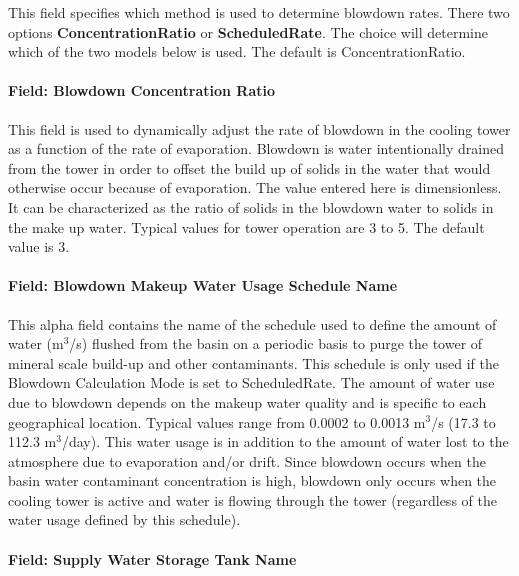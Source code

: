 This field specifies which method is used to determine blowdown rates. There two options \textbf{ConcentrationRatio} or \textbf{ScheduledRate}. The choice will determine which of the two models below is used. The default is ConcentrationRatio.

\paragraph{Field: Blowdown Concentration Ratio}\label{field-blowdown-concentration-ratio}

This field is used to dynamically adjust the rate of blowdown in the cooling tower as a function of the rate of evaporation. Blowdown is water intentionally drained from the tower in order to offset the build up of solids in the water that would otherwise occur because of evaporation. The value entered here is dimensionless. It can be characterized as the ratio of solids in the blowdown water to solids in the make up water. Typical values for tower operation are 3 to 5. The default value is 3.

\paragraph{Field: Blowdown Makeup Water Usage Schedule Name}\label{field-blowdown-makeup-water-usage-schedule-name}

This alpha field contains the name of the schedule used to define the amount of water (m\(^{3}\)/s) flushed from the basin on a periodic basis to purge the tower of mineral scale build-up and other contaminants. This schedule is only used if the Blowdown Calculation Mode is set to ScheduledRate. The amount of water use due to blowdown depends on the makeup water quality and is specific to each geographical location. Typical values range from 0.0002 to 0.0013 m\(^{3}\)/s (17.3 to 112.3 m\(^{3}\)/day). This water usage is in addition to the amount of water lost to the atmosphere due to evaporation and/or drift. Since blowdown occurs when the basin water contaminant concentration is high, blowdown only occurs when the cooling tower is active and water is flowing through the tower (regardless of the water usage defined by this schedule).

\paragraph{Field: Supply Water Storage Tank Name}\label{field-supply-water-storage-tank-name}

